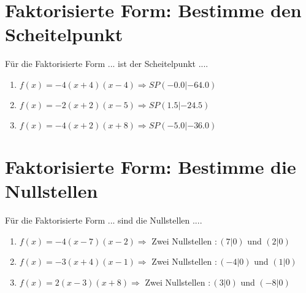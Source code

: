 \documentclass{article}%
\begin{document}
%
\section{Faktorisierte Form: Bestimme den Scheitelpunkt}%
\label{sec:FaktorisierteFormBestimmedenScheitelpunkt}%
Für die Faktorisierte Form ... ist der Scheitelpunkt ....%
\begin{enumerate}[label=\alph*)]%
\item%
\newline\vspace{0.5cm}$f(x)=-4(x+4)(x-4) \Rightarrow SP(-0.0|-64.0) $%
\item%
\newline\vspace{0.5cm}$f(x)=-2(x+2)(x-5) \Rightarrow SP(1.5|-24.5) $%
\item%
\newline\vspace{0.5cm}$f(x)=-4(x+2)(x+8) \Rightarrow SP(-5.0|-36.0) $%
\end{enumerate}

%
\section{Faktorisierte Form: Bestimme die Nullstellen}%
\label{sec:FaktorisierteFormBestimmedieNullstellen}%
Für die Faktorisierte Form ... sind die Nullstellen ....%
\begin{enumerate}[label=\alph*)]%
\item%
\newline\vspace{0.5cm}$f(x)=-4(x-7)(x-2) \Rightarrow $ Zwei Nullstellen $: (7|0) $ und $ (2|0) $%
\item%
\newline\vspace{0.5cm}$f(x)=-3(x+4)(x-1) \Rightarrow $ Zwei Nullstellen $: (-4|0) $ und $ (1|0) $%
\item%
\newline\vspace{0.5cm}$f(x)=2(x-3)(x+8) \Rightarrow $ Zwei Nullstellen $: (3|0) $ und $ (-8|0) $%
\end{enumerate}

%
\end{document}
